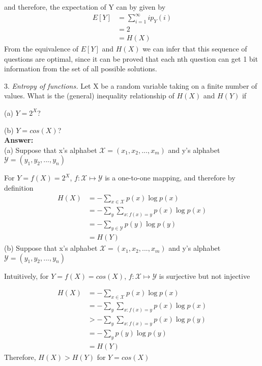 \documentclass[12pt]{article}
\begin{document}
	and therefore, the expectation of Y can by given by 
	\begin{align*}
		E[Y] &= \sum_{i=1}^{\infty}ip_Y(i) \\
			 &= 2 \\
			 &= H(X) 
	\end{align*}
	From the equivalence of $E[Y]$ and $H(X)$ we can infer that this sequence of questions are optimal, since it can be proved that each nth question can get 1 bit information from the set of all possible solutions.\\
	\par  
	3. \textit{Entropy of functions.} Let X be a random variable taking on a finite number of values. What is the (general) inequality relationship of $H(X)$ and $H(Y)$ if \par 
	(a) $Y = 2^X$? \par 
	(b) $Y = cos(X)$? \\
	\textbf{Answer:} \\
	(a) Suppose that x's alphabet $\mathcal{X} = (x_1,x_2,...,x_m)$ and y's alphabet $\mathcal{Y} = (y_1,y_2,...,y_n)$  \par 
		For $Y = f(X) = 2^X$, $f:\mathcal{X}\mapsto\mathcal{Y}$ is a one-to-one mapping, and therefore by definition
		\begin{align*}
			H(X) &= -\sum_{x\in\mathcal{X}}p(x)\log p(x) \\
			     &= -\sum_{y}\sum_{x:f(x)=y}p(x)\log p(x) \\
			     &= -\sum_{y\in\mathcal{Y}}p(y)\log p(y) \\
			     &= H(Y)
		\end{align*}
	(b) Suppose that x's alphabet $\mathcal{X} = (x_1,x_2,...,x_m)$ and y's alphabet $\mathcal{Y} = (y_1,y_2,...,y_n)$  \par 
		Intuitively, for $Y = f(X) = cos(X)$, $f:\mathcal{X}\mapsto\mathcal{Y}$ is surjective but not injective \par 
		\begin{align*}
			H(X) &= -\sum_{x\in\mathcal{X}}p(x)\log p(x) \\
			     &= -\sum_{y}\sum_{x:f(x)=y}p(x)\log p(x) \\
			     &> -\sum_{y}\sum_{x:f(x)=y}p(x)\log p(y) \\
			     &= -\sum_{y}p(y)\log p(y) \\
			     &= H(Y)
		\end{align*}  
		Therefore, $H(X) > H(Y)$ for $Y = cos(X)$ \\
		\par 
\end{document}
